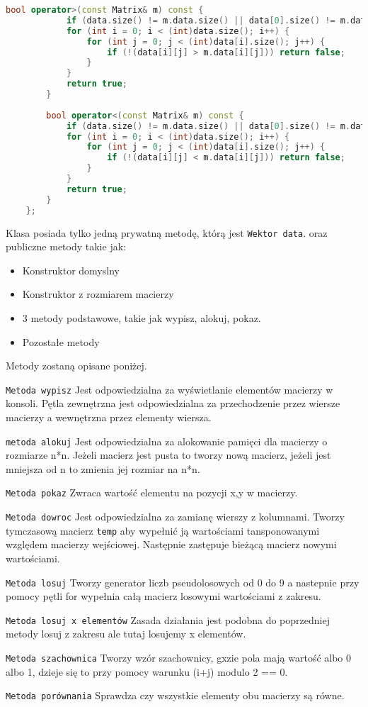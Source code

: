 \begin{lstlisting}[caption=Klasa \texttt{MergeSorter}, label={lst:matrixclass}, language=C++]
		bool operator>(const Matrix& m) const {
			if (data.size() != m.data.size() || data[0].size() != m.data[0].size()) return false;
			for (int i = 0; i < (int)data.size(); i++) {
				for (int j = 0; j < (int)data[i].size(); j++) {
					if (!(data[i][j] > m.data[i][j])) return false;
				}
			}
			return true;
		}
		
		bool operator<(const Matrix& m) const {
			if (data.size() != m.data.size() || data[0].size() != m.data[0].size()) return false;
			for (int i = 0; i < (int)data.size(); i++) {
				for (int j = 0; j < (int)data[i].size(); j++) {
					if (!(data[i][j] < m.data[i][j])) return false;
				}
			}
			return true;
		}
	};
\end{lstlisting}
  
Klasa posiada tylko jedną prywatną metodę, którą jest \texttt{Wektor data}. oraz publiczne metody takie jak:
\begin{itemize}
	\item Konstruktor domyslny
	\item Konstruktor z rozmiarem macierzy
	\item 3 metody podstawowe, takie jak wypisz, alokuj, pokaz.
	\item Pozostałe metody
\end{itemize}
Metody zostaną opisane poniżej.

\texttt{Metoda wypisz}
Jest odpowiedzialna za wyświetlanie elementów macierzy w konsoli. Pętla zewnętrzna jest odpowiedzialna za przechodzenie przez wiersze macierzy a wewnętrzna przez elementy wiersza.

\texttt{metoda alokuj}
Jest odpowiedzialna za alokowanie pamięci dla macierzy o rozmiarze n*n.
Jeżeli macierz jest pusta to tworzy nową macierz, jeżeli jest mniejsza od n to zmienia jej rozmiar na n*n.

\texttt{Metoda pokaz}
Zwraca wartość elementu na pozycji x,y w macierzy.

\texttt{Metoda dowroc}
Jest odpowiedzialna za zamianę wierszy z kolumnami. Tworzy tymczasową macierz \texttt{temp} aby wypełnić ją wartościami tansponowanymi względem macierzy wejściowej. Następnie zastępuje bieżącą macierz nowymi wartościami.

\texttt{Metoda losuj}
Tworzy generator liczb pseudolosowych od 0 do 9 a nastepnie przy pomocy pętli for wypełnia całą macierz losowymi wartościami z zakresu.

\texttt{Metoda losuj x elementów}
Zasada działania jest podobna do poprzedniej metody losuj z zakresu ale tutaj losujemy x elementów.

\texttt{Metoda szachownica}
Tworzy wzór szachownicy, gxzie pola mają wartość albo 0 albo 1, dzieje się to przy pomocy warunku (i+j) modulo 2 == 0.

\texttt{Metoda porównania}
Sprawdza czy wszystkie elementy obu macierzy są równe.